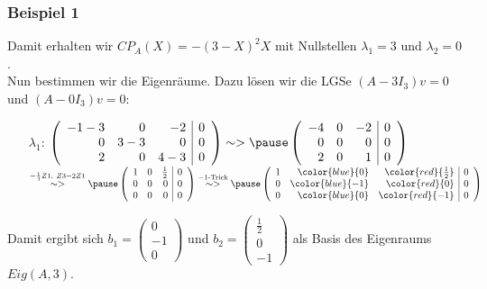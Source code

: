 \begin{frame}\frametitle{Beispiel 1}
Damit erhalten wir $CP_A(X)=-(3-X)^2X$ mit Nullstellen $\lambda_1=3$ und $\lambda_2=0$. \\\pause
Nun bestimmen wir die Eigenräume. Dazu lösen wir die LGSe $(A-3I_3)v=0$ und $(A-0I_3)v=0$:
\begin{itemize}
\item[$\lambda_1$:]
$
\left(\begin{array}{rrr|r}
-1-3 & 0 & -2& 0 \\ 0 & 3-3 & 0& 0 \\ 2 & 0 &4-3& 0
\end{array}\right)
\sim >\pause
\left(\begin{array}{rrr|r}
-4 & 0 & -2& 0 \\ 0 & 0 & 0& 0 \\ 2 & 0 &1& 0
\end{array}\right)
$\\
$\stackrel{-\frac{1}{4}Z1,\ Z3-2Z1}{\sim >}\pause
\left(\begin{array}{rrr|r}
1 & 0 & \frac{1}{2}& 0 \\ 0 & 0 & 0& 0 \\ 0 & 0 &0& 0
\end{array}\right)
\stackrel{-1\text{-Trick}}{\sim >}\pause
\left(\begin{array}{rrr|r}
1 & \color{blue}{0} & \color{red}{\frac{1}{2}}& 0 \\ 0 & \color{blue}{-1} & \color{red}{0}& 0 \\ 0 & \color{blue}{0} &\color{red}{-1}& 0
\end{array}\right)
$
\end{itemize}
Damit ergibt sich $b_1=\begin{pmatrix} 0 \\ -1 \\ 0\end{pmatrix}$ und $b_2=\begin{pmatrix} \frac{1}{2} \\ 0 \\ -1\end{pmatrix}$ als Basis des Eigenraums $Eig(A,3)$.
\end{frame}
%
%
